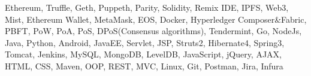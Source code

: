 \vspace{-0.5em}
\vspace{-1.5em}
\begin{cventries}
  \cventry
    {}
    {}
    {}{}
    {
      \begin{cvitems}
        \item {Ethereum, Truffle, Geth, Puppeth, Parity, Solidity, Remix IDE, IPFS, Web3, Mist, Ethereum Wallet, MetaMask, EOS, Docker, Hyperledger Composer\&Fabric, PBFT, PoW, PoA, PoS, DPoS(Consensus algorithms), Tendermint, Go, NodeJs, Java, Python, Android, JavaEE, Servlet, JSP, Struts2, Hibernate4, Spring3, Tomcat, Jenkins, MySQL, MongoDB, LevelDB, JavaScript, jQuery, AJAX, HTML, CSS, Maven, OOP, REST, MVC, Linux, Git, Postman, Jira, Infura}         
      \end{cvitems}
    }
    
\end{cventries}
